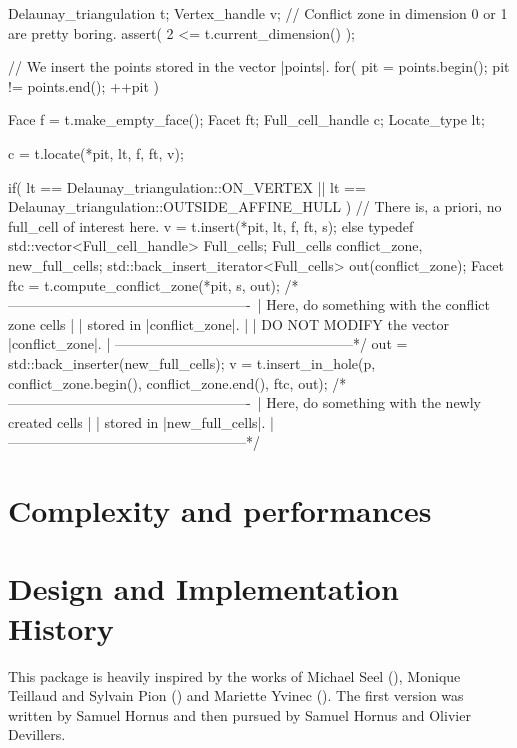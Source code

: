 \begin{ccExampleCode}
Delaunay_triangulation t;
Vertex_handle v;
// Conflict zone in dimension 0 or 1 are pretty boring.
assert( 2 <= t.current_dimension() );

// We insert the points stored in the vector |points|.
for( pit = points.begin(); pit != points.end(); ++pit )
{
    Face             f = t.make_empty_face();
    Facet            ft;
    Full_cell_handle c;
    Locate_type      lt;

    c = t.locate(*pit, lt, f, ft, v);

    if(    lt == Delaunay_triangulation::ON_VERTEX
        || lt == Delaunay_triangulation::OUTSIDE_AFFINE_HULL )
    {
        // There is, a priori, no full_cell of interest here.
        v = t.insert(*pit, lt, f, ft, s);
    }
    else
    {
        typedef std::vector<Full_cell_handle> Full_cells;
        Full_cells conflict_zone, new_full_cells;
        std::back_insert_iterator<Full_cells> out(conflict_zone);
        Facet ftc = t.compute_conflict_zone(*pit, s, out);
        /*----------------------------------------------------\
        | Here, do something with the conflict zone cells     |
        | stored in |conflict_zone|.                          |
        | DO NOT MODIFY the vector |conflict_zone|.           |
        \----------------------------------------------------*/
        out = std::back_inserter(new_full_cells);
        v = t.insert_in_hole(p, conflict_zone.begin(), conflict_zone.end(), ftc, out);
        /*----------------------------------------------------\
        |  Here, do something with the newly created cells    |
        |  stored in |new_full_cells|.                        |
        \----------------------------------------------------*/
    }
}
\end{ccExampleCode}

\section{Complexity and performances}


\section{Design and Implementation History}

This package is heavily inspired by the works of Michael Seel
(), Monique Teillaud and Sylvain Pion ()
and Mariette Yvinec (\ccc{Triangulation_2}).
The first version was written by Samuel Hornus and then
pursued by Samuel Hornus and Olivier Devillers.
